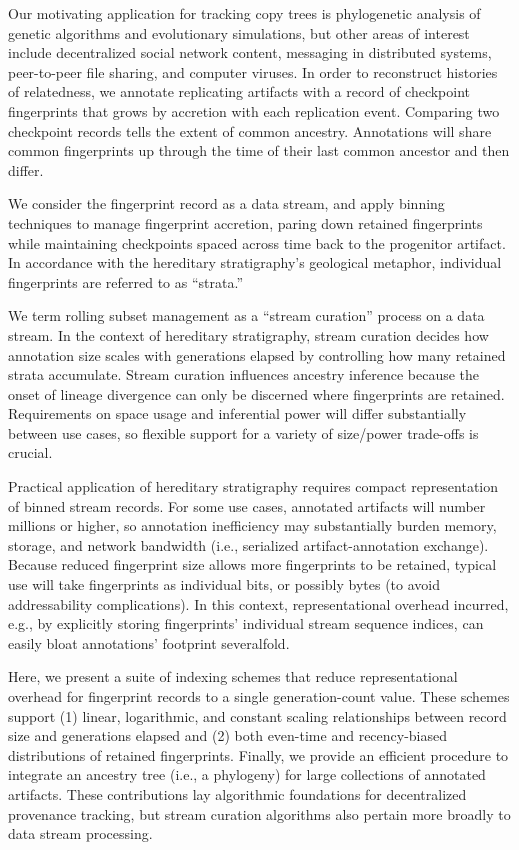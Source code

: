 Our motivating application for tracking copy trees is phylogenetic analysis of genetic algorithms and evolutionary simulations, but other areas of interest include decentralized social network content, messaging in distributed systems, peer-to-peer file sharing, and computer viruses.
In order to reconstruct histories of relatedness, we annotate replicating artifacts with a record of checkpoint fingerprints that grows by accretion with each replication event.
Comparing two checkpoint records tells the extent of common ancestry.
Annotations will share common fingerprints up through the time of their last common ancestor and then differ.

We consider the fingerprint record as a data stream, and apply binning techniques to manage fingerprint accretion, paring down retained fingerprints while maintaining checkpoints spaced across time back to the progenitor artifact.
In accordance with the hereditary stratigraphy's geological metaphor, individual fingerprints are referred to as ``strata.''

We term rolling subset management as a ``stream curation'' process on a data stream.
In the context of hereditary stratigraphy, stream curation decides how annotation size scales with generations elapsed by controlling how many retained strata accumulate.
Stream curation influences ancestry inference because the onset of lineage divergence can only be discerned where fingerprints are retained.
Requirements on space usage and inferential power will differ substantially between use cases, so flexible support for a variety of size/power trade-offs is crucial.

Practical application of hereditary stratigraphy requires compact representation of binned stream records.
For some use cases, annotated artifacts will number millions or higher, so annotation inefficiency may substantially burden memory, storage, and network bandwidth (i.e., serialized artifact-annotation exchange).
Because reduced fingerprint size allows more fingerprints to be retained, typical use will take fingerprints as individual bits, or possibly bytes (to avoid addressability complications).
In this context, representational overhead incurred, e.g., by explicitly storing fingerprints' individual stream sequence indices, can easily bloat annotations' footprint severalfold.

Here, we present a suite of indexing schemes that reduce representational overhead for fingerprint records to a single generation-count value.
These schemes support (1) linear, logarithmic, and constant scaling relationships between record size and generations elapsed and (2) both even-time and recency-biased distributions of retained fingerprints.
Finally, we provide an efficient procedure to integrate an ancestry tree (i.e., a phylogeny) for large collections of annotated artifacts.
These contributions lay algorithmic foundations for decentralized provenance tracking, but stream curation algorithms also pertain more broadly to data stream processing.

